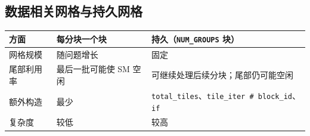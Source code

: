 \subsection*{数据相关网格与持久网格}

\begin{table}[htbp]\centering\small
\begin{tabularx}{\linewidth}{@{}lXX@{}}
\toprule
\textbf{方面} & \textbf{每分块一个块} & \textbf{持久（\texttt{NUM\_GROUPS} 块）} \\
\midrule
网格规模 & 随问题增长 & 固定 \\
尾部利用率 & 最后一批可能使 SM 空闲 & 可继续处理后续分块；尾部仍可能空闲 \\
额外构造 & 最少 & \texttt{total\_tiles}、\texttt{tile\_iter \# block\_id}、\texttt{if} \\
复杂度 & 较低 & 较高 \\
\bottomrule
\end{tabularx}
\end{table}
